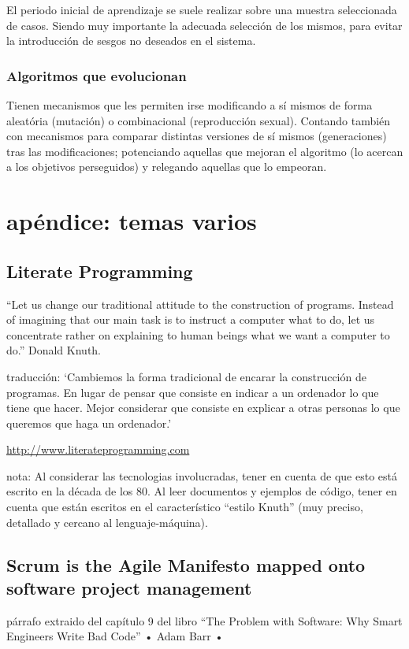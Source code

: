 \documentclass[spanish,12pt,a4paper,final,oneside]{book}
\begin{document}
El periodo inicial de aprendizaje se suele realizar sobre una muestra seleccionada de casos. Siendo muy importante la adecuada selección de los mismos, para evitar la introducción de sesgos no deseados en el sistema.

\subsection{Algoritmos que evolucionan}
Tienen mecanismos que les permiten irse modificando a sí mismos de forma aleatória (mutación) o combinacional (reproducción sexual). Contando también con mecanismos para comparar distintas versiones de sí mismos (generaciones) tras las modificaciones; potenciando aquellas que mejoran el algoritmo (lo acercan a los objetivos perseguidos) y relegando aquellas que lo empeoran.




\chapter*{apéndice: temas varios}

\section*{Literate Programming}
``Let us change our traditional attitude to the construction of programs. Instead of imagining that our main task is to instruct a computer what to do, let us concentrate rather on explaining to human beings what we want a computer to do.''
Donald Knuth.

traducción: ‘Cambiemos la forma tradicional de encarar la construcción de programas. En lugar de pensar que consiste en indicar a un ordenador lo que tiene que hacer. Mejor considerar que consiste en explicar a otras personas lo que queremos que haga un ordenador.’

\url{http://www.literateprogramming.com} 

nota: Al considerar las tecnologias involucradas, tener en cuenta de que esto está escrito en la década de los 80. Al leer documentos y ejemplos de código, tener en cuenta que están escritos en el característico ``estilo Knuth'' (muy preciso, detallado y cercano al lenguaje-máquina).

\section*{Scrum is the Agile Manifesto mapped onto software project management}
párrafo extraido del capítulo 9 del libro ``The Problem with Software: Why Smart Engineers Write Bad Code'' • Adam Barr • 
\end{document}
